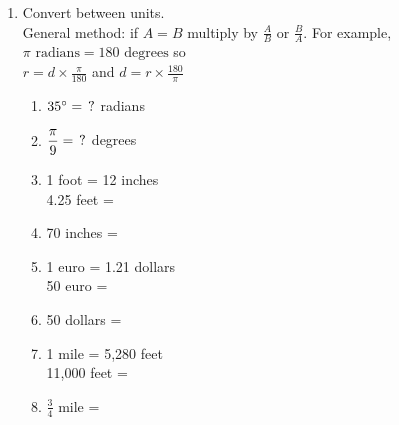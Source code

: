 \documentclass[12pt, twoside]{article}
\begin{document}
\begin{enumerate}
\newpage
\item Convert between units. \\[0.25cm]
General method: if $A = B$ multiply by $\displaystyle \frac{A}{B} \text{ or } \frac{B}{A}$. For example, $\pi \text{ radians}= 180 \text{ degrees}$ so \\
$\displaystyle r = d \times \frac{\pi}{180}$ and 
$\displaystyle d = r \times \frac{180}{\pi}$
\vspace{0.5cm}
  \begin{multicols}{2}
  \raggedcolumns
  \begin{enumerate}[itemsep=1.5cm]
    \item $35^\circ = \hspace{0.15cm} ?$ radians
    \item $\displaystyle \frac{\pi}{9}  = \hspace{0.15cm} ?$ degrees
    \item 1 foot = 12 inches\\[0.5cm]
    4.25 feet = 
    \item 70 inches = 
    \item 1 euro = 1.21 dollars\\[0.5cm]
    50 euro = 
    \item 50 dollars = 
    \item 1 mile = 5,280 feet\\[0.5cm]
    11,000 feet = 
    \item $\displaystyle \frac{3}{4}$ mile =   
  \end{enumerate}
  \end{multicols}
    

\end{enumerate}
\end{document}
